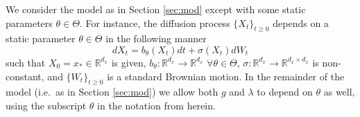\documentclass[english]{article}
\begin{document}
We consider the model as in Section \ref{sec:mod} except with some static parameters $\theta\in\Theta$.
For instance, the diffusion process $\{X_t\}_{t\geq 0}$ depends on a static parameter $\theta\in\Theta$ in the following manner
\begin{equation}
dX_t=b_{\theta}(X_t)dt+\sigma(X_t)dW_t
\label{eq:diff_theta}
\end{equation}
such that $X_0=x_*\in \mathbb{R}^{d_x}$ is given, $b_{\theta}:\mathbb{R}^{d_x}\rightarrow \mathbb{R}^{d_x}$ $   
\forall \theta \in \Theta$, $\sigma:\mathbb{R}^{d_x}\rightarrow \mathbb{R}^{d_x\times d_x}$ is non-constant, and $\{W_t\}_{t\geq 0}$ is a standard Brownian motion. In the remainder of the model (i.e.~as in Section \ref{sec:mod}) we allow both $g$ and $\lambda$ to depend on $\theta$ as well, using the subscript $\theta$ in the notation from herein. 
%
%
%
%
%
%
\end{document}
